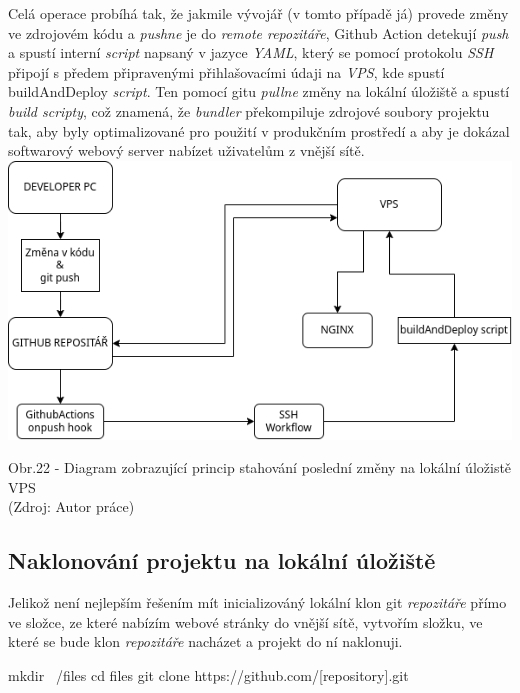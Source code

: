 \documentclass[12pt,a4paper]{report}
\begin{document}
  Celá operace probíhá tak, že jakmile vývojář (v tomto případě já) provede změny ve zdrojovém kódu
  a \emph{pushne} je do \emph{remote repozitáře}, Github Action detekují \emph{push} a spustí interní \emph{script} napsaný
  v jazyce \emph{YAML}, který se pomocí protokolu \emph{SSH} připojí s předem připravenými přihlašovacími
  údaji  na \emph{VPS}, kde spustí buildAndDeploy \emph{script}. Ten pomocí gitu \emph{pullne} změny na lokální úložiště 
  a spustí \emph{build scripty}, což znamená, že \emph{bundler} překompiluje zdrojové soubory projektu tak, aby byly 
  optimalizované pro použití v produkčním prostředí a aby je dokázal softwarový webový server nabízet uživatelům z vnější sítě.
  \vfill
  \vspace*{0.5cm}
  \noindent\includegraphics[width=\linewidth]{CIDC_visualization.png}
  \begin{center}
    Obr.22 - Diagram zobrazující princip stahování poslední změny na lokální úložistě VPS \\
    (Zdroj: Autor práce)
  \end{center}
  \vspace*{0.5cm}

  \subsection{Naklonování projektu na lokální úložiště}
  Jelikož není nejlepším řešením mít inicializováný lokální klon git \emph{repozitáře} přímo ve složce, ze které 
  nabízím webové stránky do vnější sítě, vytvořím složku, ve které se bude klon \emph{repozitáře} nacházet a projekt do ní naklonuji.
  \begin{bash}
    mkdir ~/files
    cd files
    git clone https://github.com/[repository].git 
  \end{bash}
  
\end{document}
